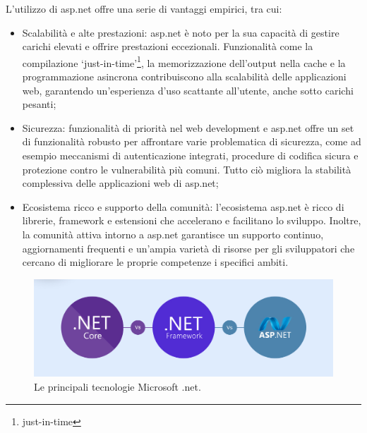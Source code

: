 L'utilizzo di \acrshort{asp.net} offre una serie di vantaggi empirici, tra cui:
\begin{itemize}
    \item Scalabilità e alte prestazioni: \acrshort{asp.net} è noto per la sua capacità di gestire carichi elevati e offrire prestazioni eccezionali. Funzionalità come la compilazione `just-in-time'\footnote{\glsdesc{just-in-time}}, la memorizzazione dell'output nella cache e la programmazione asincrona contribuiscono alla scalabilità delle applicazioni web, garantendo un'esperienza d'uso scattante all'utente, anche sotto carichi pesanti;
    \item Sicurezza: funzionalità di priorità nel web development e \acrshort{asp.net} offre un set di funzionalità robusto per affrontare varie problematica di sicurezza, come ad esempio meccanismi di autenticazione integrati, procedure di codifica sicura e protezione contro le vulnerabilità più comuni. Tutto ciò migliora la stabilità complessiva delle applicazioni web di \acrshort{asp.net};
    \item Ecosistema ricco e supporto della comunità: l'ecosistema \acrshort{asp.net} è ricco di librerie, \gls{framework} e estensioni che accelerano e facilitano lo sviluppo. Inoltre, la comunità attiva intorno a \acrshort{asp.net} garantisce un supporto continuo, aggiornamenti frequenti e un'ampia varietà di risorse per gli sviluppatori che cercano di migliorare le proprie competenze i specifici ambiti.
\end{itemize}

\begin{figure}[H]
\centering
\includegraphics[width=1\textwidth]{Images/net vs.jpg}
\caption{\label{fig:net vs}Le principali tecnologie Microsoft \gls{.net}.}
\end{figure}

